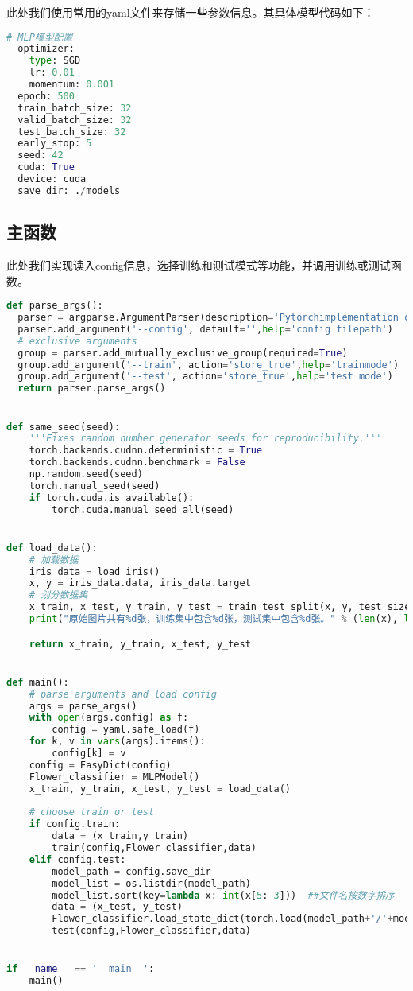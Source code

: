 \documentclass[lang=cn,a4paper]{elegantpaper}
\begin{document}
此处我们使用常用的yaml文件来存储一些参数信息。其具体模型代码如下：

\begin{lstlisting}[language = python]
  # MLP模型配置
  optimizer:
    type: SGD
    lr: 0.01
    momentum: 0.001
  epoch: 500
  train_batch_size: 32
  valid_batch_size: 32
  test_batch_size: 32
  early_stop: 5
  seed: 42
  cuda: True
  device: cuda
  save_dir: ./models
\end{lstlisting}

\subsection{主函数}

此处我们实现读入config信息，选择训练和测试模式等功能，并调用训练或测试函数。

\begin{lstlisting}[language = python]
def parse_args():
  parser = argparse.ArgumentParser(description='Pytorchimplementation of Classification')
  parser.add_argument('--config', default='',help='config filepath')
  # exclusive arguments
  group = parser.add_mutually_exclusive_group(required=True)
  group.add_argument('--train', action='store_true',help='trainmode')
  group.add_argument('--test', action='store_true',help='test mode')
  return parser.parse_args()


def same_seed(seed):
    '''Fixes random number generator seeds for reproducibility.'''
    torch.backends.cudnn.deterministic = True
    torch.backends.cudnn.benchmark = False
    np.random.seed(seed)
    torch.manual_seed(seed)
    if torch.cuda.is_available():
        torch.cuda.manual_seed_all(seed)


def load_data():
    # 加载数据
    iris_data = load_iris()
    x, y = iris_data.data, iris_data.target
    # 划分数据集
    x_train, x_test, y_train, y_test = train_test_split(x, y, test_size=0.2, random_state=42)
    print("原始图片共有%d张，训练集中包含%d张，测试集中包含%d张。" % (len(x), len(x_train), len(x_test)))

    return x_train, y_train, x_test, y_test


def main():
    # parse arguments and load config
    args = parse_args()
    with open(args.config) as f:
        config = yaml.safe_load(f)
    for k, v in vars(args).items():
        config[k] = v
    config = EasyDict(config)
    Flower_classifier = MLPModel()
    x_train, y_train, x_test, y_test = load_data()
    
    # choose train or test
    if config.train:
        data = (x_train,y_train)
        train(config,Flower_classifier,data)
    elif config.test:
        model_path = config.save_dir
        model_list = os.listdir(model_path)
        model_list.sort(key=lambda x: int(x[5:-3]))  ##文件名按数字排序
        data = (x_test, y_test)
        Flower_classifier.load_state_dict(torch.load(model_path+'/'+model_list[-1]))
        test(config,Flower_classifier,data)


if __name__ == '__main__':
    main()
\end{lstlisting}
\end{document}
